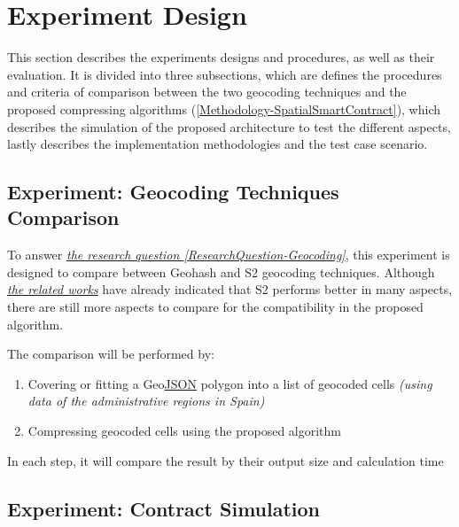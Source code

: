 
\section{Experiment Design} \label{Methodology-ExperimentDesign}

\npara This section describes the experiments designs and procedures, as well as their evaluation.
It is divided into three subsections, which are
   defines the procedures and criteria of comparison between the two geocoding techniques and the proposed compressing algorithms (\ref{Methodology-SpatialSmartContract}),
   which describes the simulation of the proposed architecture to test the different aspects,
  lastly  describes the implementation methodologies and the test case scenario.

\subsection{Experiment: Geocoding Techniques Comparison} \label{Methodology-ExperimentDesign-TechniquesComparison}

\npara To answer \hyperref[ResearchQuestion-Geocoding]{\textit{the research question \ref{ResearchQuestion-Geocoding}}}, this experiment is designed to compare between Geohash and S2 geocoding techniques.
Although \hyperref[RelatedWorks]{\textit{the related works}} have already indicated that S2 performs better in many aspects, there are still more aspects to compare for the compatibility in the proposed algorithm.

\npara The comparison will be performed by:
\begin{enumerate}
  \item Covering or fitting a Geo\hyperref[Acronym-JSON]{JSON} polygon into a list of geocoded cells \textit{(using data of the administrative regions in Spain)}
  \item Compressing geocoded cells using the proposed algorithm
\end{enumerate}
In each step, it will compare the result by their output size and calculation time

\subsection{Experiment: Contract Simulation} \label{Methodology-ExperimentDesign-Simulation}

